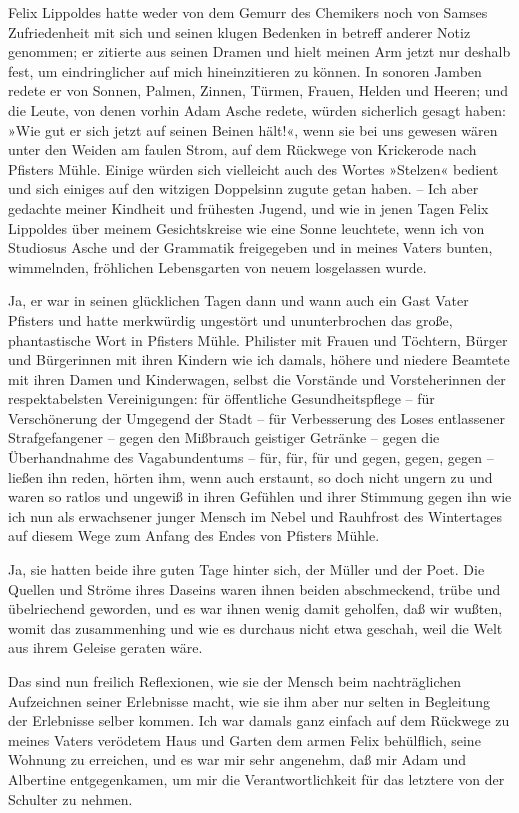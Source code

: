 Felix Lippoldes hatte weder von dem Gemurr des Chemikers noch von
Samses Zufriedenheit mit sich und seinen klugen Bedenken in betreff
anderer Notiz genommen; er zitierte aus seinen Dramen und hielt
meinen Arm jetzt nur deshalb fest, um eindringlicher auf mich
hineinzitieren zu können. In sonoren Jamben redete er von Sonnen,
Palmen, Zinnen, Türmen, Frauen, Helden und Heeren; und die Leute,
von denen vorhin Adam Asche redete, würden sicherlich gesagt haben:
»Wie gut er sich jetzt auf seinen Beinen hält!«, wenn sie bei uns
gewesen wären unter den Weiden am faulen Strom, auf dem Rückwege
von Krickerode nach Pfisters Mühle. Einige würden sich vielleicht
auch des Wortes »Stelzen« bedient und sich einiges auf den witzigen
Doppelsinn zugute getan haben. – Ich aber gedachte meiner Kindheit
und frühesten Jugend, und wie in jenen Tagen Felix Lippoldes über
meinem Gesichtskreise wie eine Sonne leuchtete, wenn ich von
Studiosus Asche und der Grammatik freigegeben und in meines Vaters
bunten, wimmelnden, fröhlichen Lebensgarten von neuem losgelassen
wurde.

Ja, er war in seinen glücklichen Tagen dann und wann auch ein Gast
Vater Pfisters und hatte merkwürdig ungestört und ununterbrochen
das große, phantastische Wort in Pfisters Mühle. Philister mit
Frauen und Töchtern, Bürger und Bürgerinnen mit ihren Kindern wie
ich damals, höhere und niedere Beamtete mit ihren Damen und
Kinderwagen, selbst die Vorstände und Vorsteherinnen der
respektabelsten Vereinigungen: für öffentliche Gesundheitspflege –
für Verschönerung der Umgegend der Stadt – für Verbesserung des
Loses entlassener Strafgefangener – gegen den Mißbrauch geistiger
Getränke – gegen die Überhandnahme des Vagabundentums – für, für,
für und gegen, gegen, gegen – ließen ihn reden, hörten ihm, wenn
auch erstaunt, so doch nicht ungern zu und waren so ratlos und
ungewiß in ihren Gefühlen und ihrer Stimmung gegen ihn wie ich nun
als erwachsener junger Mensch im Nebel und Rauhfrost des
Wintertages auf diesem Wege zum Anfang des Endes von Pfisters
Mühle.

Ja, sie hatten beide ihre guten Tage hinter sich, der Müller und
der Poet. Die Quellen und Ströme ihres Daseins waren ihnen beiden
abschmeckend, trübe und übelriechend geworden, und es war ihnen
wenig damit geholfen, daß wir wußten, womit das zusammenhing und
wie es durchaus nicht etwa geschah, weil die Welt aus ihrem Geleise
geraten wäre.

Das sind nun freilich Reflexionen, wie sie der Mensch beim
nachträglichen Aufzeichnen seiner Erlebnisse macht, wie sie ihm
aber nur selten in Begleitung der Erlebnisse selber kommen. Ich war
damals ganz einfach auf dem Rückwege zu meines Vaters verödetem
Haus und Garten dem armen Felix behülflich, seine Wohnung zu
erreichen, und es war mir sehr angenehm, daß mir Adam und Albertine
entgegenkamen, um mir die Verantwortlichkeit für das letztere von
der Schulter zu nehmen.

